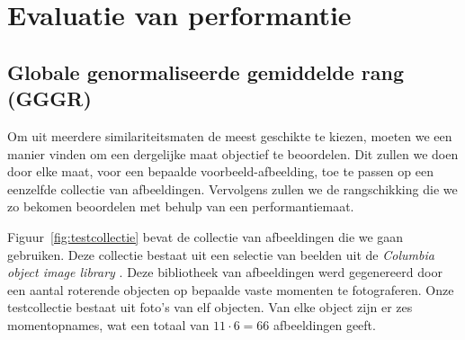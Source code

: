 \section{Evaluatie van performantie}

\subsection{Globale genormaliseerde gemiddelde rang (GGGR)}

Om uit meerdere similariteitsmaten de meest geschikte te kiezen, 
moeten we een manier vinden om een dergelijke maat objectief te beoordelen. 
Dit zullen we doen door elke
maat, voor een bepaalde voorbeeld-afbeelding, toe te passen op een eenzelfde collectie 
van afbeeldingen. Vervolgens zullen we de rangschikking die we zo bekomen
beoordelen met behulp van een performantiemaat.

Figuur~\ref{fig:testcollectie} bevat de collectie van afbeeldingen die we gaan 
gebruiken. Deze collectie bestaat uit een selectie van beelden uit
de \emph{Columbia object image library} \cite{coil-100}. Deze bibliotheek van afbeeldingen 
werd gegenereerd 
door een aantal roterende objecten op bepaalde vaste momenten te fotograferen. 
Onze testcollectie bestaat uit foto's van elf objecten. Van elke object zijn
er zes momentopnames, wat een totaal van $11 \cdot 6 = 66$ afbeeldingen geeft.


